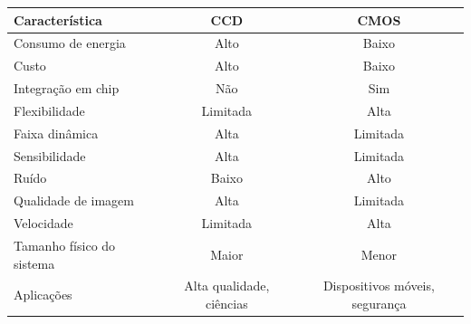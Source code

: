 \begin{quadro}[htbp]
    \centering
    \caption{Resumo comparativo das principais características entre sensores CCD e CMOS.}
    \label{quad:ccd_vs_cmos}
    \begin{tabular}{|l|c|c|}
    \hline
    \textbf{Característica}        & \textbf{CCD}             & \textbf{CMOS}                  \\ \hline
    Consumo de energia            & Alto                     & Baixo                          \\ \hline
    Custo                         & Alto                     & Baixo                          \\ \hline
    Integração em chip            & Não                      & Sim                            \\ \hline
    Flexibilidade                 & Limitada                 & Alta                           \\ \hline
    Faixa dinâmica                & Alta                     & Limitada                       \\ \hline
    Sensibilidade                 & Alta                     & Limitada                       \\ \hline
    Ruído                         & Baixo                    & Alto                           \\ \hline
    Qualidade de imagem           & Alta                     & Limitada                       \\ \hline
    Velocidade                    & Limitada                 & Alta                           \\ \hline
    Tamanho físico do sistema     & Maior                    & Menor                          \\ \hline
    Aplicações                    & Alta qualidade, ciências & Dispositivos móveis, segurança \\ \hline
    \end{tabular}
\end{quadro}
